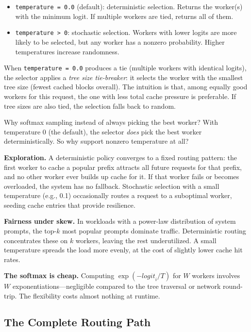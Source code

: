 \begin{itemize}
  \item \texttt{temperature = 0.0} (default): deterministic selection. Returns the worker(s) with the minimum logit. If multiple workers are tied, returns all of them.
  \item \texttt{temperature > 0}: stochastic selection. Workers with lower logits are more likely to be selected, but any worker has a nonzero probability. Higher temperatures increase randomness.
\end{itemize}

When \texttt{temperature = 0.0} produces a tie (multiple workers with identical logits), the selector applies a \emph{tree size tie-breaker}: it selects the worker with the smallest tree size (fewest cached blocks overall). The intuition is that, among equally good workers for this request, the one with less total cache pressure is preferable. If tree sizes are also tied, the selection falls back to random.

\begin{whynotbox}{Why softmax sampling instead of always picking the best worker?}
With temperature 0 (the default), the selector \emph{does} pick the best worker deterministically. So why support nonzero temperature at all?

\textbf{Exploration.} A deterministic policy converges to a fixed routing pattern: the first worker to cache a popular prefix attracts all future requests for that prefix, and no other worker ever builds up cache for it. If that worker fails or becomes overloaded, the system has no fallback. Stochastic selection with a small temperature (e.g., 0.1) occasionally routes a request to a suboptimal worker, seeding cache entries that provide resilience.

\textbf{Fairness under skew.} In workloads with a power-law distribution of system prompts, the top-$k$ most popular prompts dominate traffic. Deterministic routing concentrates these on $k$ workers, leaving the rest underutilized. A small temperature spreads the load more evenly, at the cost of slightly lower cache hit rates.

\textbf{The softmax is cheap.} Computing $\exp(-\mathit{logit}_i / T)$ for $W$ workers involves $W$ exponentiations---negligible compared to the tree traversal or network round-trip. The flexibility costs almost nothing at runtime.
\end{whynotbox}

\subsection{The Complete Routing Path}

